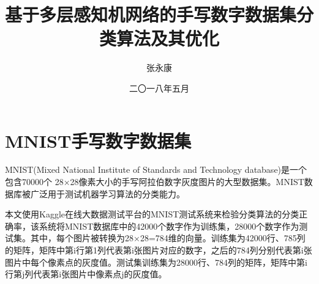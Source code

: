 \documentclass[forprint]{WHUBachelor}
\begin{document}
   
   \miji{ }                                      %
   
   \title{基于多层感知机网络的手写数字数据集分类算法及其优化}
   \author{张永康}                            %
   \date{二〇一八年五月}                    %
   
   \maketitle
   \frontmatter
   \tableofcontents
   \mainmatter %
   \chapter{MNIST手写数字数据集}
    
     MNIST(Mixed National Institute of Standards and Technology database)是一个包含70000个
     28×28像素大小的手写阿拉伯数字灰度图片的大型数据集。MNIST数据库被广泛用于测试机器学习算法的分类能力。
     
     本文使用Kaggle在线大数据测试平台的MNIST测试系统来检验分类算法的分类正确率，该系统将MNIST数据库中的42000个数字作为训练集，28000个数字作为测试集。其中，每个图片被转换为28×28=784维的向量。训练集为42000行、785列的矩阵，矩阵中第i行第1列代表第i张图片对应的数字，之后的784列分别代表第i张图片中每个像素点的灰度值。测试集训练集为28000行、784列的矩阵，矩阵中第i行第j列代表第i张图片中像素点j的灰度值。
   
\end{document}
